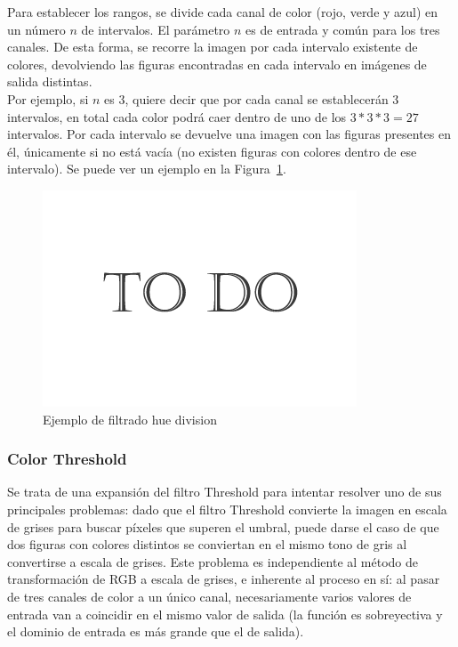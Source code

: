 {	Para establecer los rangos, se divide cada canal de color (rojo, verde y azul) en un número $n$ de intervalos. El parámetro $n$ es de entrada y común para los tres canales. De esta forma, se recorre la imagen por cada intervalo existente de colores, devolviendo las figuras encontradas en cada intervalo en imágenes de salida distintas.\\
	
	Por ejemplo, si $n$ es 3, quiere decir que por cada canal se establecerán 3 intervalos, en total cada color podrá caer dentro de uno de los $3*3*3=27$ intervalos. Por cada intervalo se devuelve una imagen con las figuras presentes en él, únicamente si no está vacía (no existen figuras con colores dentro de ese intervalo). Se puede ver un ejemplo en la Figura~\ref{fig:canny}.
	
		\begin{figure}[htbp]
		\centering
		\hspace*{-0.3in}
		\includegraphics[scale=0.47]{graphics/todo.png}
		\caption{Ejemplo de filtrado hue division}
		\label{fig:canny}
		\end{figure}
	
	\subsubsection{Color Threshold}

	Se trata de una expansión del filtro Threshold para intentar resolver uno de sus principales problemas: dado que el filtro Threshold convierte la imagen en escala de grises para buscar píxeles que superen el umbral, puede darse el caso de que dos figuras con colores distintos se conviertan en el mismo tono de gris al convertirse a escala de grises. Este problema es independiente al método de transformación de RGB a escala de grises, e inherente al proceso en sí: al pasar de tres canales de color a un único canal, necesariamente varios valores de entrada van a coincidir en el mismo valor de salida (la función es sobreyectiva y el dominio de entrada es más grande que el de salida).\\
	
}
